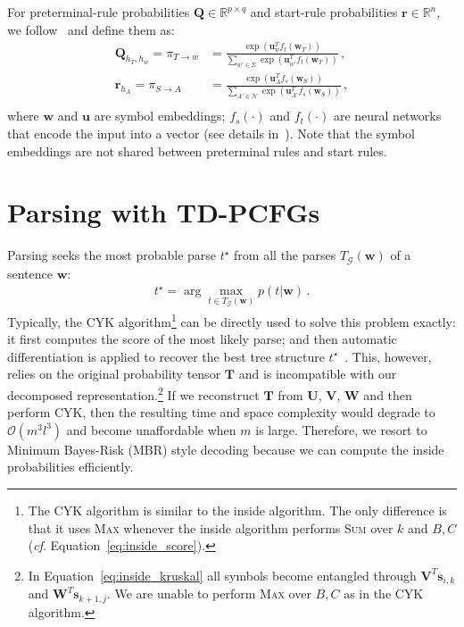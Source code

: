 \documentclass[11pt]{article}
\newcommand{\mbs}{\boldsymbol}
\begin{document}
For preterminal-rule probabilities $\mathbf{Q}\in\mathbb{R}^{p\times q}$ and start-rule probabilities $\mathbf{r}\in\mathbb{R}^{n}$, 
we follow~\cite{kim-etal-2019-compound} and define them as:
\begin{align*}
\mathbf{Q}_{h_T, h_w} = \pi_{T\rightarrow w} &= \frac{\exp(\mathbf{u}_{w}^{T} f_t(\mathbf{w}_{T}))}
{\sum_{w'\in\Sigma}\exp(\mathbf{u}_{w'}^{T} f_t(\mathbf{w}_{T}))} \,, \\
\mathbf{r}_{h_A} = \pi_{S\rightarrow A} &= \frac{\exp(\mathbf{u}_{A}^{T} f_s(\mathbf{w}_{S}))}
{\sum_{A'\in\mathcal{N}}\exp(\mathbf{u}_{A'}^{T} f_s(\mathbf{w}_{S}))} \,, \\
\end{align*}
where $\mathbf{w}$ and $\mathbf{u}$ are symbol embeddings;
$f_s(\cdot)$ and $f_t(\cdot)$ are neural networks that encode the input into a vector (see details in~\citet{kim-etal-2019-compound}). Note that the symbol embeddings are not shared between preterminal rules and start rules.

\section{Parsing with TD-PCFGs}\label{sec:inference}

Parsing seeks the most probable parse $t^\star$ from all the parses ${T_{\mathcal{G}}(\mbs{w})}$ of a sentence $\mbs{w}$:
\begin{align}
t^\star = \arg\max_{t\in T_{\mathcal{G}}(\mbs{w})} p(t | \mbs{w})\,.
\end{align}
Typically, the CYK algorithm\footnote{
	The CYK algorithm is similar to the inside algorithm. The only difference is that it uses \textsc{Max} whenever the inside algorithm performs \textsc{Sum} over $k$ and $B, C$ (\textit{cf}. Equation~\ref{eq:inside_score}).
} 
can be directly used to solve this problem exactly:
it first computes the score of the most likely parse;
and then automatic differentiation is applied to recover the best tree structure $t^\star$~\citep{eisner-2016-inside,rush-2020-torch}.
This, however, relies on the original probability tensor $\mathbf{T}$ and is incompatible with our decomposed representation.\footnote{
	In Equation~\ref{eq:inside_kruskal} all symbols become entangled through $\mathbf{V}^{T}{\mathbf{s}_{i, k}}$ and $\mathbf{W}^{T}{\mathbf{s}_{k + 1, j}}$.
	We are unable to perform \textsc{Max} over $B, C$ as in the CYK algorithm.
}
If we reconstruct $\mathbf{T}$ from $\mathbf{U}$, $\mathbf{V}$, $\mathbf{W}$ and then perform CYK, then the resulting time and space complexity would degrade to $\mathcal{O}(m^3l^3)$ and become unaffordable when $m$ is large.
Therefore, we resort to Minimum Bayes-Risk (MBR) style decoding because we can compute the inside probabilities efficiently.
\end{document}
